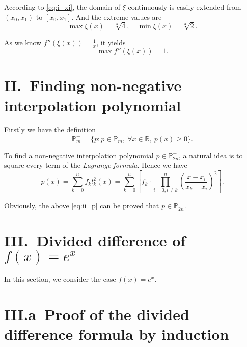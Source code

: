 \documentclass[a4paper]{article}
\begin{document}
According to \cref{eq:i_xi}, the domain of $\xi$ continuously is easily extended from $(x_0, x_1)$ to $[x_0, x_1]$.
And the extreme values are 
\begin{equation}
  \max \xi(x) = \sqrt[3]{4}, \quad \min \xi(x) = \sqrt[3]{2}.
  \label{eq:i_extreme_xi}
\end{equation} 

As we know $f''(\xi(x)) = \frac{1}{x}$, it yields
\begin{equation}
  \max f''(\xi(x)) = 1.
  \label{eq:i_max_f_prime}  
\end{equation}

\section*{II.\ Finding non-negative interpolation polynomial}

Firstly we have the definition
\begin{equation}
  \mathbb{P}_m^+ = \{p: p \in \mathbb{P}_m,\ \forall x \in \mathbb{R},\ p(x) \geqslant 0\}.
  \label{eq:ii_def}
\end{equation}

To find a non-negative interpolation polynomial $p \in \mathbb{P}_{2n}^+$, a natural idea is to square every term of the \textit{Lagrange formula}. 
Hence we have
\begin{equation}
    p(x) = \sum_{k = 0}^{n} f_k l_k^2(x) = \sum_{k = 0}^{n} \left[f_k \cdot \prod_{i = 0, i \neq k}^{n} \left(\frac{x - x_i}{x_k - x_i}\right)^2\right].
  \label{eq:ii_p}
\end{equation}

Obviously, the above \cref{eq:ii_p} can be proved that $p \in \mathbb{P}_{2n}^+$.

\section*{III.\ Divided difference of $f(x) = e^x$}

In this section, we consider the case $f(x) = e^x$.

\section*{III.a\ Proof of the divided difference formula by induction}
\end{document}
